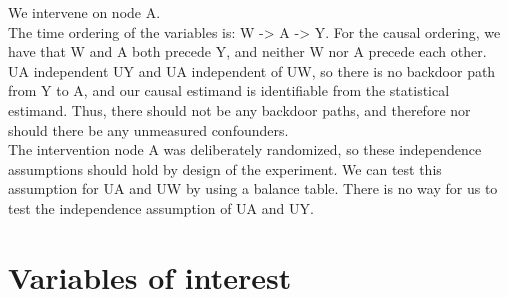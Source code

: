 \documentclass[oneside, notitlepage]{book}
\begin{document}
We intervene on node A.\\

The time ordering of the variables is: W -> A -> Y. For the causal ordering, we have that W and A both precede Y, and neither W nor A precede each other.\\
                          
UA independent UY and UA independent of UW, so there is no backdoor path from Y to A, and our causal estimand is identifiable from the statistical estimand. Thus, there should not be any backdoor paths, and therefore nor should there be any unmeasured confounders.\\

The intervention node A was deliberately randomized, so these independence assumptions should hold by design of the experiment. We can test this assumption for UA and UW by using a balance table. There is no way for us to test the independence assumption of UA and UY.\\




\section{Variables of interest}
\label{sec:variables-interest}
\end{document}
